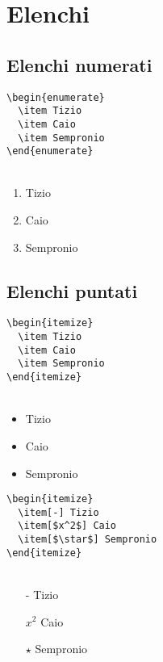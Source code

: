 \section{Elenchi}
\subsection{Elenchi numerati}
  \verb!\begin{enumerate}!\\
  \verb!  \item Tizio     !\\
  \verb!  \item Caio      !\\
  \verb!  \item Sempronio!\\
  \verb!\end{enumerate}  !\\~
  \begin{enumerate}
    \item Tizio
    \item Caio
    \item Sempronio
  \end{enumerate}
\subsection{Elenchi puntati}
  \verb!\begin{itemize}   !\\
  \verb!  \item Tizio     !\\
  \verb!  \item Caio      !\\
  \verb!  \item Sempronio!\\
  \verb!\end{itemize}     !\\~
  \begin{itemize}
    \item Tizio
    \item Caio
    \item Sempronio
  \end{itemize}
  \verb!\begin{itemize}   !\\
    \verb!  \item[-] Tizio     !\\
    \verb!  \item[$x^2$] Caio      !\\
    \verb!  \item[$\star$] Sempronio!\\
    \verb!\end{itemize}     !\\~
    \begin{itemize}
      \item[-] Tizio
      \item[$x^2$] Caio
      \item[$\star$] Sempronio
    \end{itemize}
